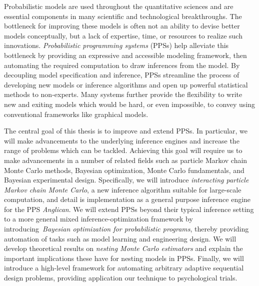 
Probabilistic models are used throughout the quantitative sciences and are essential components 
in many scientific and technological breakthroughs.  The bottleneck for improving these models
is often not an ability to devise better models conceptually,  but a lack of expertise,
time, or resources to realize such innovations.
\emph{Probabilistic programming systems} (PPSs) help alleviate this bottleneck 
by providing an expressive and accessible modeling framework,
 then
automating the required computation to draw inferences from the model.
By decoupling model specification and inference, PPSs 
streamline the process of developing new models or inference algorithms
and open up powerful statistical methods to non-experts.
Many systems further provide
the flexibility to write new and exiting models which would be hard, or even impossible, to convey using conventional frameworks like graphical models.

The central goal of this thesis is to improve and extend PPSs.  In particular, we will
make advancements to the underlying inference engines and increase the
range of problems which can be tackled.  Achieving this goal will require us to make
advancements in a number of related fields such as particle Markov chain Monte Carlo methods,
Bayesian optimization, Monte Carlo fundamentals, and Bayesian experimental design.
Specifically, we will introduce \emph{interacting particle
	Markov chain Monte Carlo},
a new inference algorithm suitable for large-scale computation, and 
detail is implementation as a general purpose inference engine for the PPS \emph{Anglican}. 
We will extend PPSs beyond their typical inference setting
to a more general mixed inference-optimization framework by introducing~\emph{Bayesian
	optimization for probabilistic programs}, thereby providing automation of tasks
such as model learning and engineering design.
We will develop theoretical 
results on \emph{nesting Monte Carlo
	estimators} and explain the important implications these have for nesting models in PPSs.
Finally, we will 
introduce a high-level framework for automating arbitrary adaptive sequential design problems, 
providing application our technique to psychological trials.
